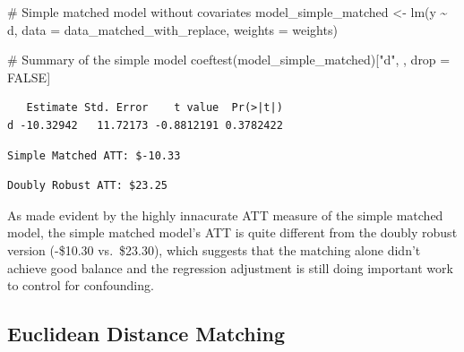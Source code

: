 \documentclass[
  letterpaper,
  DIV=11,
  numbers=noendperiod]{scrartcl}
\newenvironment{Shaded}{\begin{snugshade}}{\end{snugshade}}
\newcommand{\AttributeTok}[1]{\textcolor[rgb]{0.40,0.45,0.13}{#1}}
\newcommand{\CommentTok}[1]{\textcolor[rgb]{0.37,0.37,0.37}{#1}}
\newcommand{\ConstantTok}[1]{\textcolor[rgb]{0.56,0.35,0.01}{#1}}
\newcommand{\FunctionTok}[1]{\textcolor[rgb]{0.28,0.35,0.67}{#1}}
\newcommand{\NormalTok}[1]{\textcolor[rgb]{0.00,0.23,0.31}{#1}}
\newcommand{\OtherTok}[1]{\textcolor[rgb]{0.00,0.23,0.31}{#1}}
\newcommand{\SpecialCharTok}[1]{\textcolor[rgb]{0.37,0.37,0.37}{#1}}
\newcommand{\StringTok}[1]{\textcolor[rgb]{0.13,0.47,0.30}{#1}}
\begin{document}
\begin{Shaded}
\begin{Highlighting}[]
\CommentTok{\# Simple matched model without covariates}
\NormalTok{model\_simple\_matched }\OtherTok{\textless{}{-}} \FunctionTok{lm}\NormalTok{(y }\SpecialCharTok{\textasciitilde{}}\NormalTok{ d,}
                           \AttributeTok{data =}\NormalTok{ data\_matched\_with\_replace,}
                           \AttributeTok{weights =}\NormalTok{ weights)}

\CommentTok{\# Summary of the simple model}
\FunctionTok{coeftest}\NormalTok{(model\_simple\_matched)[}\StringTok{"d"}\NormalTok{, , drop }\OtherTok{=} \ConstantTok{FALSE}\NormalTok{]}
\end{Highlighting}
\end{Shaded}

\begin{verbatim}
   Estimate Std. Error    t value  Pr(>|t|)
d -10.32942   11.72173 -0.8812191 0.3782422
\end{verbatim}

\begin{verbatim}
Simple Matched ATT: $-10.33
\end{verbatim}

\begin{verbatim}
Doubly Robust ATT: $23.25
\end{verbatim}

As made evident by the highly innacurate ATT measure of the simple
matched model, the simple matched model's ATT is quite different from
the doubly robust version (-\$10.30 vs.~\$23.30), which suggests that
the matching alone didn't achieve good balance and the regression
adjustment is still doing important work to control for confounding.

\subsection{Euclidean Distance
Matching}\label{euclidean-distance-matching}
\end{document}
